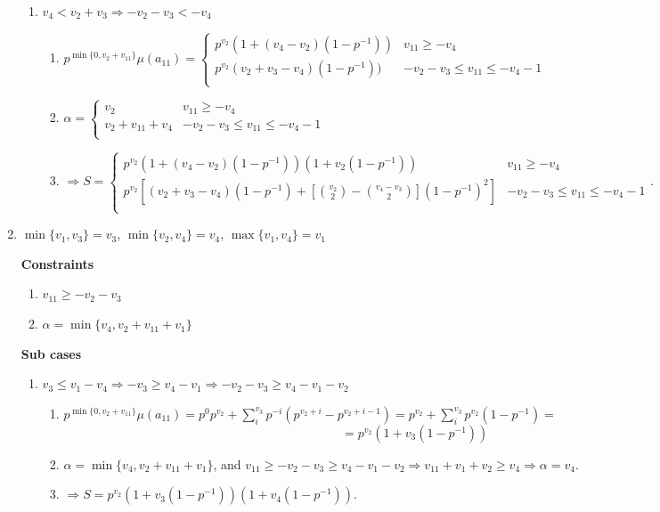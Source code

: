 \documentclass{article}
\begin{document}
\begin{enumerate}
\begin{enumerate}
        \item $v_4<{v_2+v_3}\Rightarrow{-v_2-v_3<-v_4}$

        \begin{enumerate}
            \item $p^{\min\{0,v_2+v_{11}\}}\mu(a_{11})=
            \left\{
	\begin{array}{ll}
            p^{v_2}(1+(v_4-v_2)(1-p^{-1})) & v_{11}\geq{-v_4} \\
		  p^{v_2}(v_2+v_3-v_4)(1-p^{-1})) & -v_2-v_3\leq{v_{11}}\leq{-v_4-1} \\
	\end{array}
\right.
$
            \item $\alpha=\left\{
	\begin{array}{ll}
            v_2  & v_{11}\geq{-v_4} \\
		  v_2+v_{11}+v_4 & -v_2-v_3\leq{v_{11}}\leq{-v_4-1} \\
	\end{array}
\right.$
        \item $\Rightarrow{S=\left\{
	\begin{array}{ll}
            p^{v_2}(1+(v_4-v_2)(1-p^{-1}))(1+v_2(1-p^{-1}))  & v_{11}\geq{-v_4} \\
		              p^{v_2}[(v_2+v_3-v_4)(1-p^{-1})+[\binom{v_2}{2}-\binom{v_4-v_3}{2}](1-p^{-1})^2]  & -v_2-v_3\leq{v_{11}}\leq{-v_4-1} \\
	\end{array}
\right.}.$
        \end{enumerate}

    \end{enumerate}

    \item $\min\{v_1,v_3\}=v_3$, $\min\{v_2,v_4\}=v_4$, $\max\{v_1,v_4\}=v_1$
    
    \textbf{Constraints}
    \begin{enumerate}
        \item $v_{11}\geq{-v_2-v_3}$
        \item $\alpha=\min\{v_4,v_2+v_{11}+v_1\}$
    \end{enumerate}
    
    \textbf{Sub cases}
    \begin{enumerate}
        \item $v_3\leq{v_1-v_4}\Rightarrow{-v_3\geq{v_4-v_1}}\Rightarrow{-v_2-v_3\geq{v_4-v_1-v_2}}$

        \begin{enumerate}
            \item $p^{\min\{0,v_2+v_{11}\}}\mu(a_{11})=p^{0}p^{v_2}+\sum_i^{v_3}p^{-i}(p^{v_2+i}-p^{v_2+i-1})=p^{v_2}+\sum_i^{v_3}p^{v_2}(1-p^{-1})=$\[=p^{v_2}(1+v_3(1-p^{-1}))\]
            \item $\alpha=\min\{v_4,v_2+v_{11}+v_1\}$, and $v_{11}\geq{-v_2-v_3}\geq{v_4-v_1-v_2}\Rightarrow{v_{11}+v_1+v_2\geq{v_4}}\Rightarrow{\alpha=v_4}.$
            \item $\Rightarrow{S=p^{v_2}(1+v_3(1-p^{-1}))(1+v_4(1-p^{-1}))}.$
        \end{enumerate}


\end{enumerate}
\end{enumerate}
\end{document}
